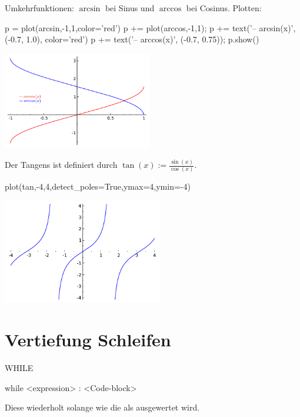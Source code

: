 \documentclass[fontsize=12pt,paper=a4,twoside,bibtotoc,idxtotoc,
liststotoc,pagesize,BCOR1.2cm,DIV15,chapterprefix,pagesize=pdftex]{scrbook}
\theoremstyle{plain}
\theoremstyle{definition}
\theoremstyle{remark}
\begin{document}
 Umkehrfunktionen: $\arcsin$ bei Sinus und $\arccos$ bei Cosinus.
Plotten: 
\begin{sagein}
p = plot(arcsin,-1,1,color='red')
p += plot(arccos,-1,1); 
p += text('-- arcsin(x)', (-0.7, 1.0), color='red')
p += text('-- arccos(x)', (-0.7, 0.75)); p.show()
\end{sagein}
\begin{center}
\includegraphics[width=6.5cm]{arcsinarccos.pdf}
\end{center}
 Der {\color{red} Tangens} ist definiert durch
$\tan(x) :=\frac{\sin(x)}{\cos(x)}$.
\begin{sagein}
plot(tan,-4,4,detect_poles=True,ymax=4,ymin=-4)
\end{sagein}
\begin{center}
\includegraphics[width=7cm]{tan.pdf}
\end{center}


\section{Vertiefung Schleifen}

WHILE

\begin{sagein}
while <expression> :
    <Code-block>
\end{sagein}
Diese wiederholt  solange wie die  als 
 ausgewertet wird.
\end{document}
